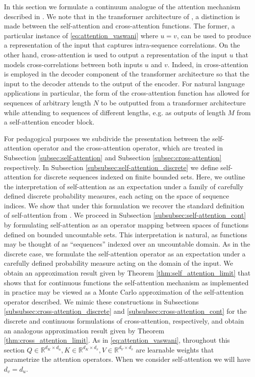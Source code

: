 \documentclass[twoside]{article}
\newcommand{\1}{\mathbbm{1}}
\newcommand{\R}{\mathbbm{R}}
\providecommand{\mathbbm}{\mathbb} %
\begin{document}
In this section we formulate a continuum analogue of the attention mechanism described in \citet{vaswani2017attention}. We note that in the transformer architecture of \citet{vaswani2017attention}, a distinction is made between the self-attention and cross-attention functions. The former, a particular instance of \eqref{eq:attention_vaswani} where $u=v$, can be used to produce a representation of the input that captures intra-sequence correlations. On the other hand, cross-attention is used to output a representation of the input $u$ that models cross-correlations between both inputs $u$ and $v$. Indeed, in \citet{vaswani2017attention} cross-attention is employed in the decoder component of the transformer architecture so that the input to the decoder attends to the output of the encoder. For natural language applications in particular, the form of the cross-attention function has allowed for sequences of arbitrary length $N$ to be outputted from a transformer architecture while attending to sequences of different lengths, e.g. as outputs of length $M$ from a self-attention encoder block. 

For pedagogical purposes we subdivide the presentation between the self-attention operator and the cross-attention operator, which are treated in Subsection \ref{subsec:self-attention} and Subsection \ref{subsec:cross-attention} respectively. In Subsection \ref{subsubsec:self-attention_discrete} we define self-attention for discrete sequences indexed on finite bounded sets. Here, we outline the interpretation of self-attention as an expectation under a family of carefully defined discrete probability measures, each acting on the space of sequence indices. We show that under this formulation we recover the standard definition of self-attention from \citet{vaswani2017attention}. We proceed in Subsection \ref{subsubsec:self-attention_cont} by formulating self-attention as an operator mapping between spaces of functions defined on bounded uncountable sets. This interpretation is natural, as functions may be thought of as ``sequences'' indexed over an uncountable domain. As in the discrete case, we formulate the self-attention operator as an expectation under a carefully defined probability measure acting on the domain of the input. We obtain an approximation result given by Theorem \ref{thm:self_attention_limit} that shows that for continuous functions the self-attention mechanism as implemented in practice may be viewed as a Monte Carlo approximation of the self-attention operator described. We mimic these constructions in Subsections \ref{subsubsec:cross-attention_discrete} and \ref{subsubsec:cross-attention_cont} for the discrete and continuous formulations of cross-attention, respectively, and obtain an analogous approximation result given by Theorem \ref{thm:cross_attention_limit}.
 As in \eqref{eq:attention_vaswani}, throughout this section $Q\in \R^{d_K\times d_u},K\in \R^{d_K\times d_v},V\in \R^{d_V\times d_v}$ are learnable weights that parametrize the attention operators. When we consider self-attention we will have $d_v=d_u.$
\end{document}
